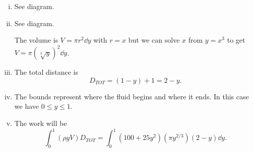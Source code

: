 \documentclass[12pt]{article}
\theoremstyle{plain}
\theoremstyle{definition}
\theoremstyle{remark}
\renewcommand{\leq}{\leqslant}      %
\renewcommand{\:}{\colon}           %
\renewcommand{\.}{\Cdot}                %
\begin{document}
\begin{ptcb}
  \begin{enumerate}[i)]
    \itemsep=-0.4em 
    \item See diagram.
    \item See diagram.\par 
    \vspace{5cm}
    The volume is $V=\pi r^2 \dd y$ with $r=x$ but we can solve $x$ from $y=x^3$ to get $V=\pi(\sqrt[3]{y})^2\dd y$.
    \item The total distance is 
    $$D_{TOT}=(1-y)+1=2-y.$$
    \item The bounds represent where the fluid begins and where it ends. In this case we have $0\leq y\leq 1$.
    \item The work will be 
    $$\int_0^1 (\rho g V)D_{TOT}=\int_0^1(100+25y^2)(\pi y^{2/3})(2-y)\dd y.$$
  \end{enumerate}
\end{ptcb}

\end{document}

